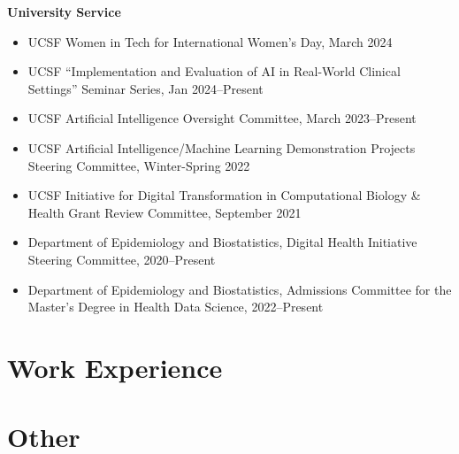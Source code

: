 \documentclass[11pt,a4paper,sans]{moderncv}        %
\begin{document}
\textbf{University Service}
\begin{itemize}
	\item UCSF Women in Tech for International Women's Day, March 2024 
	\item UCSF ``Implementation and Evaluation of AI in Real-World Clinical Settings'' Seminar Series, Jan 2024--Present
	\item UCSF Artificial Intelligence Oversight Committee, March 2023--Present
    \item UCSF Artificial Intelligence/Machine Learning Demonstration Projects Steering Committee, Winter-Spring 2022
	\item UCSF Initiative for Digital Transformation in Computational Biology \& Health Grant Review Committee, September 2021
	\item Department of Epidemiology and Biostatistics, Digital Health Initiative Steering Committee, 2020--Present
	\item Department of Epidemiology and Biostatistics, Admissions Committee for the Master's Degree in Health Data Science, 2022--Present
\end{itemize}

\section{Work Experience}

\section{Other}
\end{document}
